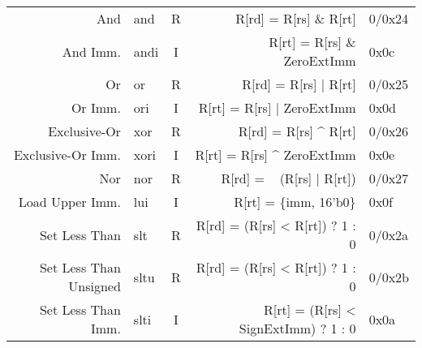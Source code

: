 \begin{tabularx}{\textwidth}{NMcDO}
    And                                                 & and                                      & R & R[rd] = R[rs] \& R[rt]                                                                            & 0/0x24 \\
    And Imm.                                            & andi                                     & I & R[rt] = R[rs] \& ZeroExtImm                                      \footnotemark[3]                 & 0x0c   \\
    Or                                                  & or                                       & R & R[rd] = R[rs] | R[rt]                                                                             & 0/0x25 \\
    Or Imm.                                             & ori                                      & I & R[rt] = R[rs] | ZeroExtImm                                       \footnotemark[3]                 & 0x0d   \\
    Exclusive-Or                                        & xor                                      & R & R[rd] = R[rs] \textasciicircum{} R[rt]                                                            & 0/0x26 \\
    Exclusive-Or Imm.                                   & xori                                     & I & R[rt] = R[rs] \textasciicircum{} ZeroExtImm                      \footnotemark[3]                 & 0x0e   \\
    Nor                                                 & nor                                      & R & R[rd] = ~ (R[rs] | R[rt])                                                                         & 0/0x27 \\
    Load Upper Imm.                                     & lui                                      & I & R[rt] = \{imm, 16'b0\}                                                                            & 0x0f   \\
    \midrule
    Set Less Than                                       & slt                                      & R & R[rd] = (R[rs] < R[rt]) ? 1 : 0                                                                   & 0/0x2a \\
    Set Less Than Unsigned                              & sltu                                     & R & R[rd] = (R[rs] < R[rt]) ? 1 : 0                                  \footnotemark[6]                 & 0/0x2b \\
    Set Less Than Imm.                                  & slti                                     & I & R[rt] = (R[rs] < SignExtImm) ? 1 : 0                             \footnotemark[2]                 & 0x0a   \\

\end{tabularx}
